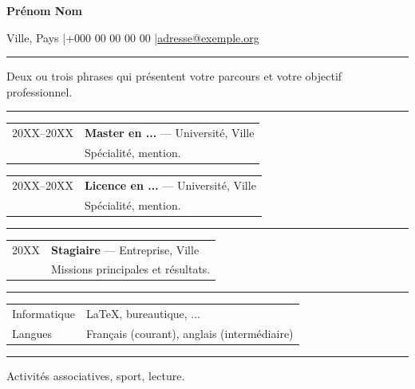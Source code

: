\documentclass[11pt,a4paper]{article}
\makeatletter
\newcommand{\rubrique}[1]{\vspace{1em}{\large\bfseries #1}\par\vspace{0.2em}\hrule\vspace{0.6em}}
\newcommand{\entree}[4]{%
  \begin{tabular}{@{}p{3cm}p{\dimexpr\textwidth-3cm-2\tabcolsep\relax}@{}}
    #1 & \textbf{#2} --- #3 \\
       & #4
  \end{tabular}\par\vspace{0.5em}}
\makeatother
\begin{document}
{\LARGE\bfseries Prénom Nom}\par
\vspace{0.3em}
Ville, Pays \quad|\quad +000 00 00 00 00 \quad|\quad \href{mailto:adresse@exemple.org}{adresse@exemple.org}

\rubrique{Profil}
Deux ou trois phrases qui présentent votre parcours et votre objectif professionnel.

\rubrique{Formation}
\entree{20XX--20XX}{Master en ...}{Université, Ville}{Spécialité, mention.}
\entree{20XX--20XX}{Licence en ...}{Université, Ville}{Spécialité, mention.}

\rubrique{Expérience}
\entree{20XX}{Stagiaire}{Entreprise, Ville}{Missions principales et résultats.}

\rubrique{Compétences}
\begin{tabular}{@{}p{3cm}l@{}}
  Informatique & \LaTeX, bureautique, ... \\
  Langues      & Français (courant), anglais (intermédiaire)
\end{tabular}

\rubrique{Centres d'intérêt}
Activités associatives, sport, lecture.
\end{document}
